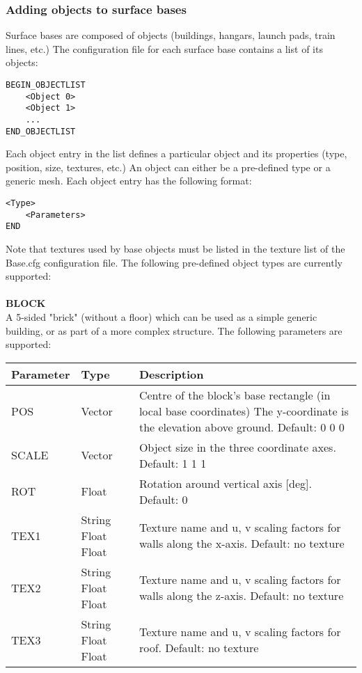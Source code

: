 \documentclass[Orbiter Developer Manual.tex]{subfiles}
\begin{document}
\subsubsection*{Adding objects to surface bases}
Surface bases are composed of objects (buildings, hangars, launch pads, train lines, etc.) The configuration file for each surface base contains a list of its objects:

\begin{lstlisting}[language=OSFS]
BEGIN_OBJECTLIST
	<Object 0>
	<Object 1>
	...
END_OBJECTLIST
\end{lstlisting}

\noindent
Each object entry in the list defines a particular object and its properties (type, position, size, textures, etc.) An object can either be a pre-defined type or a generic mesh. Each object entry has the following format:

\begin{lstlisting}[language=OSFS]
<Type>
	<Parameters>
END
\end{lstlisting}

\noindent
Note that textures used by base objects must be listed in the texture list of the Base.cfg configuration file.
The following pre-defined object types are currently supported:\\
\\
\textbf{BLOCK}\\
A 5-sided "brick" (without a floor) which can be used as a simple generic building, or as part of a more complex structure. The following parameters are supported:

	\begin{longtable}{ |p{}|p{}|p{}| }
	\hline\rule{0pt}{2ex}
	\textbf{Parameter} & \textbf{Type} & \textbf{Description}\\
	\hline\rule{0pt}{2ex}
	POS & Vector & Centre of the block’s base rectangle (in local base coordinates) The y-coordinate is the elevation above ground. Default: 0 0 0\\
	\hline\rule{0pt}{2ex}
	SCALE & Vector & Object size in the three coordinate axes. Default: 1 1 1\\
	\hline\rule{0pt}{2ex}
	ROT & Float & Rotation around vertical axis [deg]. Default: 0\\
	\hline\rule{0pt}{2ex}
	TEX1 & String Float Float & Texture name and u, v scaling factors for walls along the x-axis. Default: no texture\\
	\hline\rule{0pt}{2ex}
	TEX2 & String Float Float & Texture name and u, v scaling factors for walls along the z-axis. Default: no texture\\
	\hline\rule{0pt}{2ex}
	TEX3 & String Float Float & Texture name and u, v scaling factors for roof. Default: no texture\\
	\hline
	\end{longtable}
\end{document}
